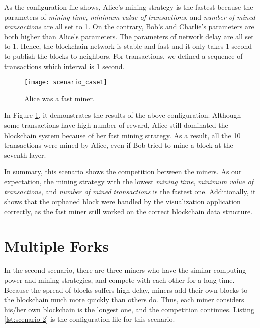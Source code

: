 As the configuration file shows, Alice's mining strategy is the fastest because the parameters of \textit{mining time}, \textit{minimum value of transactions}, and \textit{number of mined transactions} are all set to 1. On the contrary, Bob's and Charlie's parameters are both higher than Alice's parameters. The parameters of network delay are all set to 1. Hence, the blockchain network is stable and fast and it only takes 1 second to publish the blocks to neighbors. For transactions, we defined a sequence of transactions which interval is 1 second.

\begin{figure}[htb]
    \centering
    \texttt{[image: scenario\_case1]}
    \caption{Alice was a fast miner.}
    \label{fig:alice was a fast miner}
\end{figure}

In Figure \ref{fig:alice was a fast miner}, it demonstrates the results of the above configuration. Although some transactions have high number of reward, Alice still dominated the blockchain system because of her fast mining strategy. As a result, all the 10 transactions were mined by Alice, even if Bob tried to mine a block at the seventh layer. 

In summary, this scenario shows the competition between the miners. As our expectation, the mining strategy with the lowest \textit{mining time}, \textit{minimum value of transactions}, and \textit{number of mined transactions} is the fastest one. Additionally, it shows that the orphaned block were handled by the visualization application correctly, as the fast miner still worked on the correct blockchain data structure.

\section{Multiple Forks}

In the second scenario, there are three miners who have the similar computing power and mining strategies, and compete with each other for a long time. Because the spread of blocks suffers high delay, miners add their own blocks to the blockchain much more quickly than others do. Thus, each miner considers his/her own blockchain is the longest one, and the competition continues. Listing \ref{lst:scenario 2} is the configuration file for this scenario.

